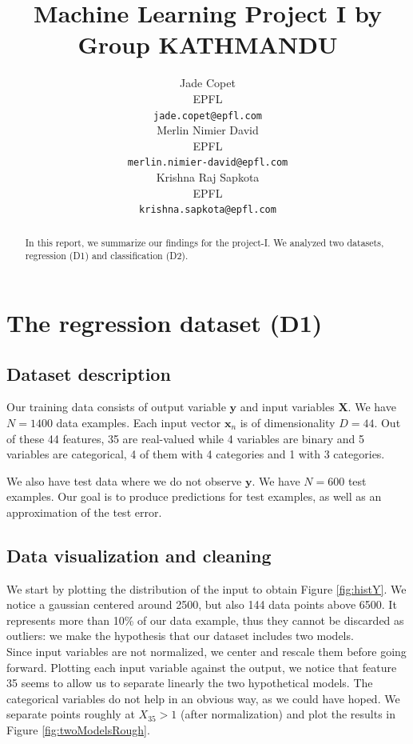 \documentclass{article} %
\title{Machine Learning Project I by Group KATHMANDU}
\author{
Jade Copet\\
EPFL \\
\texttt{jade.copet@epfl.com} \\
\And
Merlin Nimier David\\
EPFL \\
\texttt{merlin.nimier-david@epfl.com} \\
\And
Krishna Raj Sapkota\\
EPFL \\
\texttt{krishna.sapkota@epfl.com} \\
}
\begin{document}
\maketitle



\begin{abstract}
  In this report, we summarize our findings for the project-I. We analyzed two datasets, regression (D1) and classification (D2).
\end{abstract}



\section{The regression dataset (D1)}

  \subsection{Dataset description}
  Our training data consists of output variable $\mathbf{y}$ and input variables $\mathbf{X}$. We have $N = 1400$ data examples. Each input vector $\mathbf{x}_n$ is of dimensionality $D = 44$. Out of these 44 features, 35 are real-valued while 4 variables are binary and 5 variables are categorical, 4 of them with 4 categories and 1 with 3 categories.

  We also have test data where we do not observe $\mathbf{y}$. We have $N = 600$ test examples. Our goal is to produce predictions for test examples, as well as an approximation of the test error.

  \subsection{Data visualization and cleaning}
  We start by plotting the distribution of the input to obtain Figure \ref{fig:histY}. We notice a gaussian centered around 2500, but also 144 data points above 6500. It represents more than 10\% of our data example, thus they cannot be discarded as outliers: we make the hypothesis that our dataset includes two models.\\

  Since input variables are not normalized, we center and rescale them before going forward. Plotting each input variable against the output, we notice that feature 35 seems to allow us to separate linearly the two hypothetical models. The categorical variables do not help in an obvious way, as we could have hoped. We separate points roughly at $X_{35} > 1$ (after normalization) and plot the results in Figure \ref{fig:twoModelsRough}.\\
  
\end{document}
